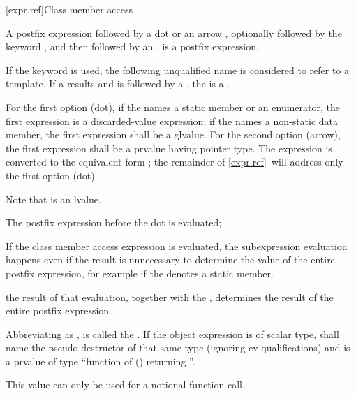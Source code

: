[expr.ref]{Class member access}

\pnum
{}%
%
%
%
%
%
%
%
%
%
A postfix expression followed by a dot  or an arrow \tcode{->},
optionally followed by the keyword
, and then followed by an
, is a postfix expression.
\begin{note}
If the keyword  is used,
the following unqualified name
is considered to refer to a template.
If a  results and is followed by a \tcode{::},
the  is a .
\end{note}

\pnum
{}%
For the first option (dot),
if the  names a static member or an enumerator,
the first expression is a discarded-value expression;
if the  names a non-static data member,
the first expression shall be a glvalue.
For the second option (arrow), the first expression
shall be a prvalue having pointer type.
The expression  is
converted to the equivalent form ; the remainder of
\ref{expr.ref}~will address only the first option (dot).
\begin{footnote}
Note that
 is an lvalue.
\end{footnote}

\pnum
The postfix expression before the dot is evaluated;
\begin{footnote}
If the class member
access expression is evaluated, the subexpression evaluation happens even if the
result is unnecessary to determine
the value of the entire postfix expression, for example if the
 denotes a static member.
\end{footnote}
the result of that evaluation,
together with the ,
determines the result of the entire postfix expression.

\pnum
Abbreviating
as ,  is called the .
If the object expression is of scalar type,
 shall name the pseudo-destructor
of that same type (ignoring cv-qualifications) and
 is a prvalue of type ``function of () returning ''.
\begin{note}
This value can only be used
for a notional function call.
\end{note}

